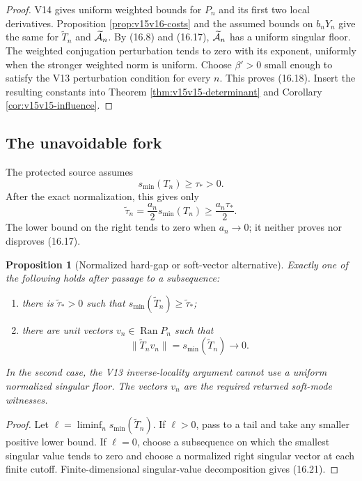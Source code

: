 \documentclass[11pt]{article}
\newtheorem{proposition}[theorem]{Proposition}
\theoremstyle{remark}
\begin{document}
\begin{proof}
V14 gives uniform weighted bounds for \(P_n\) and its first two
local derivatives.  Proposition \ref{prop:v15v16-costs} and the
assumed bounds on \(b_nY_n\) give the same for
\(\widetilde T_n\) and \(\widetilde{\cal A}_n\).  By (16.8) and
(16.17), \(\widetilde{\cal A}_n\) has a uniform singular floor.
The weighted conjugation perturbation tends to zero with its
exponent, uniformly when the stronger weighted norm is uniform.
Choose \(\beta'>0\) small enough to satisfy the V13 perturbation
condition for every \(n\).  This proves (16.18).  Insert the
resulting constants into Theorem
\ref{thm:v15v15-determinant} and Corollary
\ref{cor:v15v15-influence}.
\end{proof}

\subsection{The unavoidable fork}

The protected source assumes
\[
 s_{\min}(T_n)\ge\tau_*>0.                                 \tag{16.19}
\]
After the exact normalization, this gives only
\[
 \widetilde\tau_n
 =\frac{a_n}{2}s_{\min}(T_n)
 \ge\frac{a_n\tau_*}{2}.                                   \tag{16.20}
\]
The lower bound on the right tends to zero when \(a_n\to0\); it
neither proves nor disproves (16.17).

\begin{proposition}[Normalized hard-gap or soft-vector alternative]
\label{prop:v15v16-fork}
Exactly one of the following holds after passage to a subsequence:
\begin{enumerate}
\item there is \(\widetilde\tau_*>0\) such that
      \(s_{\min}(\widetilde T_n)\ge\widetilde\tau_*\);
\item there are unit vectors
      \(v_n\in\operatorname{Ran}P_n\) such that
      \[
       \|\widetilde T_nv_n\|
       =s_{\min}(\widetilde T_n)\longrightarrow0.           \tag{16.21}
      \]
\end{enumerate}
In the second case, the V13 inverse-locality argument cannot use a
uniform normalized singular floor.  The vectors \(v_n\) are the
required returned soft-mode witnesses.
\end{proposition}

\begin{proof}
Let \(\ell=\liminf_n s_{\min}(\widetilde T_n)\).  If
\(\ell>0\), pass to a tail and take any smaller positive lower
bound.  If \(\ell=0\), choose a subsequence on which the smallest
singular value tends to zero and choose a normalized right singular
vector at each finite cutoff.  Finite-dimensional singular-value
decomposition gives (16.21).
\end{proof}
\end{document}
